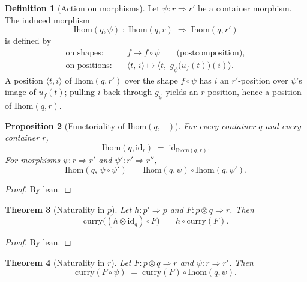\documentclass[11pt,a4paper]{article}
\theoremstyle{plain}
\newtheorem{theorem}{Theorem}[section]
\newtheorem{proposition}[theorem]{Proposition}
\theoremstyle{definition}
\newtheorem{definition}[theorem]{Definition}
\newcommand{\id}{\mathrm{id}}
\newcommand{\Ihom}{\mathrm{Ihom}}
\begin{document}
\begin{definition}[Action on morphisms]\label{def:ihom-map}
Let $\psi : r \Rightarrow r'$ be a container morphism. The induced morphism
\begin{equation}
  \Ihom(q,\psi) \;:\; \Ihom(q,r) \;\Rightarrow\; \Ihom(q,r')
\end{equation}
is defined by
\begin{align}
  \text{on shapes:}
  &\quad f \mapsto f \circ \psi
  \qquad\text{(postcomposition)}, \\[4pt]
  \text{on positions:}
  &\quad
  \langle t,\, i \rangle
  \mapsto
  \bigl\langle t,\;
    g_\psi\bigl(u_f(t)\bigr)(i)
  \bigr\rangle.
\end{align}
A position $\langle t, i \rangle$ of $\Ihom(q,r')$ over the shape
$f \circ \psi$ has $i$ an $r'$-position over $\psi$'s image of $u_f(t)$;
pulling $i$ back through $g_\psi$ yields an $r$-position, hence a position
of $\Ihom(q,r)$.
\end{definition}

\begin{proposition}[Functoriality of $\Ihom(q,-)$]\label{prop:ihom-func}
For every container $q$ and every container $r$,
\begin{equation}
  \Ihom(q, \id_r) \;=\; \id_{\Ihom(q,r)}.
\end{equation}
For morphisms $\psi : r \Rightarrow r'$ and $\psi' : r' \Rightarrow r''$,
\begin{equation}
  \Ihom(q,\, \psi \circ \psi')
  \;=\;
  \Ihom(q,\psi) \circ \Ihom(q,\psi').
\end{equation}
\end{proposition}

\begin{proof}
By lean.
\end{proof}

\begin{theorem}[Naturality in $p$]\label{thm:nat-left}
Let $h : p' \Rightarrow p$ and $F : p \otimes q \Rightarrow r$. Then
\begin{equation}
  \mathrm{curry}\bigl((h \otimes \id_q) \circ F\bigr)
  \;=\;
  h \circ \mathrm{curry}(F).
\end{equation}
\end{theorem}

\begin{proof}
By lean.
\end{proof}

\begin{theorem}[Naturality in $r$]\label{thm:nat-right}
Let $F : p \otimes q \Rightarrow r$ and $\psi : r \Rightarrow r'$. Then
\begin{equation}
  \mathrm{curry}(F \circ \psi)
  \;=\;
  \mathrm{curry}(F) \circ \Ihom(q,\psi).
\end{equation}
\end{theorem}
\end{document}

